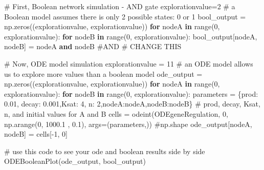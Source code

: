 \documentclass[
  letterpaper,
  DIV=11,
  numbers=noendperiod]{scrreprt}
\newenvironment{Shaded}{\begin{snugshade}}{\end{snugshade}}
\newcommand{\BuiltInTok}[1]{\textcolor[rgb]{0.00,0.23,0.31}{#1}}
\newcommand{\CommentTok}[1]{\textcolor[rgb]{0.37,0.37,0.37}{#1}}
\newcommand{\ControlFlowTok}[1]{\textcolor[rgb]{0.00,0.23,0.31}{\textbf{#1}}}
\newcommand{\DecValTok}[1]{\textcolor[rgb]{0.68,0.00,0.00}{#1}}
\newcommand{\FloatTok}[1]{\textcolor[rgb]{0.68,0.00,0.00}{#1}}
\newcommand{\KeywordTok}[1]{\textcolor[rgb]{0.00,0.23,0.31}{\textbf{#1}}}
\newcommand{\NormalTok}[1]{\textcolor[rgb]{0.00,0.23,0.31}{#1}}
\newcommand{\OperatorTok}[1]{\textcolor[rgb]{0.37,0.37,0.37}{#1}}
\newcommand{\StringTok}[1]{\textcolor[rgb]{0.13,0.47,0.30}{#1}}
\theoremstyle{definition}
\theoremstyle{remark}
\begin{document}
\begin{Shaded}
\begin{Highlighting}[]
\CommentTok{\# First, Boolean network simulation {-} AND gate}
\NormalTok{explorationvalue}\OperatorTok{=}\DecValTok{2} \CommentTok{\# a Boolean model assumes there is only 2 possible states: 0 or 1}
\NormalTok{bool\_output }\OperatorTok{=}\NormalTok{ np.zeros((explorationvalue, explorationvalue))}
\ControlFlowTok{for}\NormalTok{ nodeA }\KeywordTok{in} \BuiltInTok{range}\NormalTok{(}\DecValTok{0}\NormalTok{, explorationvalue):}
    \ControlFlowTok{for}\NormalTok{ nodeB }\KeywordTok{in} \BuiltInTok{range}\NormalTok{(}\DecValTok{0}\NormalTok{, explorationvalue):}
\NormalTok{        bool\_output[nodeA, nodeB] }\OperatorTok{=}\NormalTok{ nodeA }\KeywordTok{and}\NormalTok{ nodeB }\CommentTok{\#AND \# CHANGE THIS}

\CommentTok{\# Now, ODE model simulation}
\NormalTok{explorationvalue }\OperatorTok{=} \DecValTok{11} \CommentTok{\# an ODE model allows us to explore more values than a boolean model}
\NormalTok{ode\_output }\OperatorTok{=}\NormalTok{ np.zeros((explorationvalue, explorationvalue))}
\ControlFlowTok{for}\NormalTok{ nodeA }\KeywordTok{in} \BuiltInTok{range}\NormalTok{(}\DecValTok{0}\NormalTok{, explorationvalue):}
    \ControlFlowTok{for}\NormalTok{ nodeB }\KeywordTok{in} \BuiltInTok{range}\NormalTok{(}\DecValTok{0}\NormalTok{, explorationvalue):}
\NormalTok{        parameters }\OperatorTok{=}\NormalTok{ \{}\StringTok{\textquotesingle{}prod\textquotesingle{}}\NormalTok{: }\FloatTok{0.01}\NormalTok{, }\StringTok{\textquotesingle{}decay\textquotesingle{}}\NormalTok{: }\FloatTok{0.001}\NormalTok{,}\StringTok{\textquotesingle{}Ksat\textquotesingle{}}\NormalTok{: }\DecValTok{4}\NormalTok{, }\StringTok{\textquotesingle{}n\textquotesingle{}}\NormalTok{: }\DecValTok{2}\NormalTok{,}\StringTok{\textquotesingle{}nodeA\textquotesingle{}}\NormalTok{:nodeA,}\StringTok{\textquotesingle{}nodeB\textquotesingle{}}\NormalTok{:nodeB\} }\CommentTok{\# prod, decay, Ksat, n, and initial values for A and B}
\NormalTok{        cells }\OperatorTok{=}\NormalTok{ odeint(ODEgeneRegulation, }\DecValTok{0}\NormalTok{, np.arange(}\DecValTok{0}\NormalTok{, }\FloatTok{1000.1}\NormalTok{ , }\FloatTok{0.1}\NormalTok{), args}\OperatorTok{=}\NormalTok{(parameters,)) }\CommentTok{\#np.shape}
\NormalTok{        ode\_output[nodeA, nodeB] }\OperatorTok{=}\NormalTok{ cells[}\OperatorTok{{-}}\DecValTok{1}\NormalTok{, }\DecValTok{0}\NormalTok{]}

\CommentTok{\# use this code to see your ode and boolean results side by side}
\NormalTok{ODEBooleanPlot(ode\_output, bool\_output)}
\end{Highlighting}
\end{Shaded}
\end{document}

